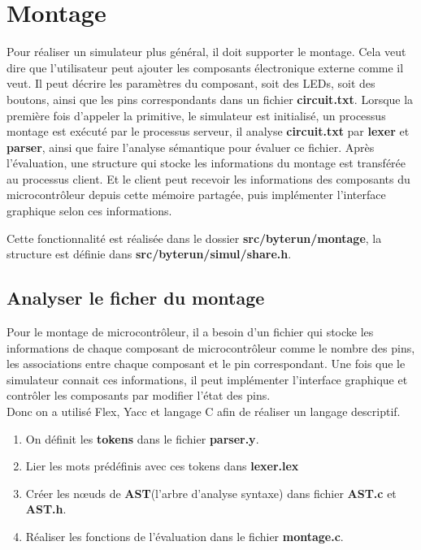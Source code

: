 \documentclass[14px]{article}
\begin{document}
	\clearpage
	\pagestyle{fancy}
	\rhead{\thepage}
	\fancyfoot{}
	
	\section{Montage}
	Pour réaliser un simulateur plus général, il doit supporter le montage. Cela veut dire que l'utilisateur peut ajouter les composants électronique externe comme il veut. Il peut décrire les paramètres du composant, soit des LEDs, soit des boutons, ainsi que les pins correspondants dans un fichier \textbf{circuit.txt}. Lorsque la première fois d'appeler la primitive, le simulateur est initialisé, un processus montage est exécuté par le processus serveur, il analyse \textbf{circuit.txt} par \textbf{lexer} et \textbf{parser}, ainsi que faire l'analyse sémantique pour évaluer ce fichier. Après l'évaluation, une structure qui stocke les informations du montage est transférée au processus client. Et le client peut recevoir les informations des composants du microcontrôleur depuis cette mémoire partagée, puis implémenter l'interface graphique selon ces informations.
	
	Cette fonctionnalité est réalisée dans le dossier \textbf{src/byterun/montage}, la structure est définie dans \textbf{src/byterun/simul/share.h}.
	
	\subsection{Analyser le ficher du montage}
	Pour le montage de microcontrôleur, il a besoin d'un fichier qui stocke les informations de chaque composant de microcontrôleur comme le nombre des pins, les associations entre chaque composant et le pin correspondant. Une fois que le simulateur connait ces informations, il peut implémenter l'interface graphique et contrôler les composants par modifier l'état des pins.\\
	Donc on a utilisé Flex, Yacc et langage C afin de réaliser un langage descriptif.
	\begin{enumerate}
		\item On définit les \textbf{tokens} dans le fichier \textbf{parser.y}.
		\item Lier les mots prédéfinis avec ces tokens dans \textbf{lexer.lex}
		\item Créer les nœuds de \textbf{AST}(l'arbre d'analyse syntaxe) dans fichier \textbf{AST.c} et \textbf{AST.h}.
		\item Réaliser les fonctions de l'évaluation dans le fichier \textbf{montage.c}.
	\end{enumerate}
	
\end{document}
